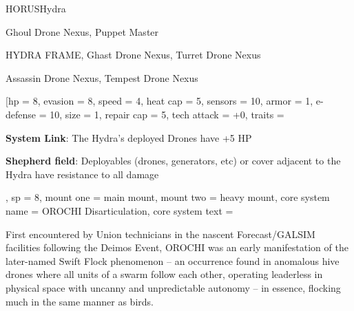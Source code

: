 
\begin{mech}{HORUS}{Hydra}


\begin{license}
\item Ghoul Drone Nexus, Puppet Master
\item HYDRA FRAME, Ghast Drone Nexus, Turret Drone Nexus
\item Assassin Drone Nexus, Tempest Drone Nexus
\end{license}


\frameBox
[hp = 8,
evasion = 8,
speed = 4,
heat cap = 5,
sensors = 10,
armor = 1,
e-defense = 10,
size = 1,
repair cap = 5,
tech attack = +0,
traits = {\textbf{System Link}: The Hydra's deployed Drones have +5 HP

\textbf{Shepherd field}: Deployables (drones, generators, etc) or cover adjacent to the Hydra have resistance to all damage},
sp = 8,
mount one = main mount,
mount two = heavy mount,
core system name = OROCHI Disarticulation,
core system text = {First encountered by Union technicians in the nascent Forecast/GALSIM facilities following the Deimos Event, OROCHI was an early manifestation of the later-named Swift Flock phenomenon -- an occurrence found in anomalous hive drones where all units of a swarm follow each other, operating leaderless in physical space with uncanny and unpredictable autonomy -- in essence, flocking much in the same manner as birds.

}
\end{mech}

